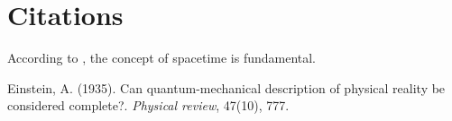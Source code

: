 \documentclass[12pt]{article}
\begin{document}
\section{Citations}

According to \cite{einstein1935can}, the concept of spacetime is fundamental.

\begin{thebibliography}{9}
Einstein, A. (1935). Can quantum-mechanical description of physical reality be considered complete?. \textit{Physical review}, 47(10), 777.
\end{thebibliography}
\end{document}
